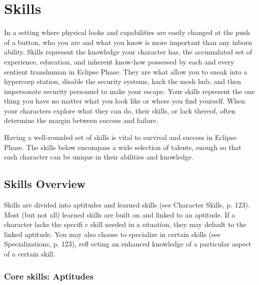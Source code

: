 \chapter{Skills}
\label{cha:skills}

In a setting where physical looks and capabilities are easily changed at the push of a button, who you are and what you know is more important than any inborn ability. Skills represent the knowledge your character has, the accumulated set of experience, education, and inherent know-how possessed by each and every sentient transhuman in Eclipse Phase. They are what allow you to sneak into a hypercorp station, disable the security systems, hack the mesh hub, and then impersonate security personnel to make your escape. Your skills represent the one thing you have no matter what you look like or where you find yourself. When your characters explore what they can do, their skills, or lack thereof, often determine the margin between success and failure.

Having a well-rounded set of skills is vital to survival and success in Eclipse Phase. The skills below encompass a wide selection of talents, enough so that each character can be unique in their abilities and knowledge.


\section{Skills Overview}
\label{sec:skillsoverview}

Skills are divided into aptitudes and learned skills (see Character Skills, p. 123). Most (but not all) learned skills are built on and linked to an aptitude. If a character lacks the specifi c skill needed in a situation, they may default to the linked aptitude. You may also
choose to specialize in certain skills (see Specializations, p. 123), refl ecting an enhanced knowledge of a particular aspect of a certain skill.


\subsection{Core skills: Aptitudes}
\label{sec:coreskillsaptitudes}

